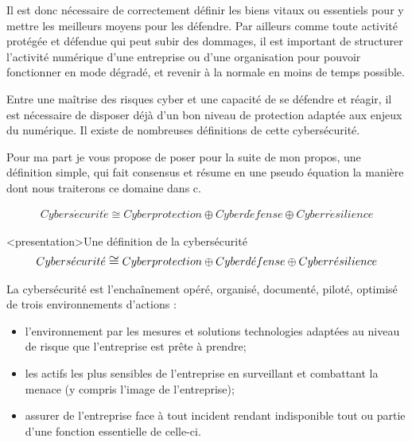 Il est donc nécessaire de correctement définir les biens vitaux ou essentiels pour y mettre les meilleurs moyens pour les défendre. Par ailleurs comme toute activité protégée et défendue qui peut subir des dommages, il est important de structurer l'activité numérique d'une entreprise ou d'une organisation pour pouvoir fonctionner en mode dégradé, et revenir à la normale en moins de temps possible.


Entre une maîtrise des risques cyber et une capacité de se défendre et réagir, il est nécessaire de disposer déjà d'un bon niveau de protection adaptée aux enjeux du numérique. Il existe de nombreuses définitions de cette cybersécurité.

Pour ma part je vous propose de poser pour la suite de mon propos, une définition simple, qui fait consensus et résume en une pseudo équation la manière dont nous traiterons ce domaine dans c\ecours. \\
\begin{nota}
\begin{align}
Cybers\acute{e}curit\acute{e} \cong Cyberprotection\oplus Cyberd\acute{e}fense \oplus Cyberr\acute{e}silience
\end{align}
\end{nota}


\begin{frame}<presentation>{Une définition de la cybersécurité}
\begin{align}
{\large
Cybers\acute{e}curit\acute{e} \cong Cyberprotection\oplus Cyberd\acute{e}fense \oplus Cyberr\acute{e}silience
        }
\end{align}
\end{frame}

\begin{frame}

La cybersécurité est l'enchaînement opéré, organisé, documenté, piloté, optimisé de trois environnements d'actions :
\begin{itemize}
 \item {} l'environnement par les mesures et solutions technologies adaptées au niveau de risque que l'entreprise est prête à prendre; 
 \item {} les actifs les plus sensibles de l'entreprise en surveillant et combattant la menace (y compris l'image de l'entreprise);
 \item assurer  de l'entreprise face à tout incident rendant indisponible tout ou partie d'une fonction essentielle de celle-ci.
\end{itemize}

\end{frame}


